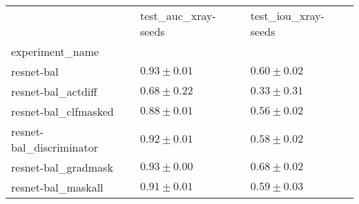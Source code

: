 \begin{tabular}{lll}
\toprule
{} & test_auc_xray-seeds & test_iou_xray-seeds \\
experiment_name          &                     &                     \\
\midrule
resnet-bal               &       $0.93\pm0.01$ &       $0.60\pm0.02$ \\
resnet-bal_actdiff       &       $0.68\pm0.22$ &       $0.33\pm0.31$ \\
resnet-bal_clfmasked     &       $0.88\pm0.01$ &       $0.56\pm0.02$ \\
resnet-bal_discriminator &       $0.92\pm0.01$ &       $0.58\pm0.02$ \\
resnet-bal_gradmask      &       $0.93\pm0.00$ &       $0.68\pm0.02$ \\
resnet-bal_maskall       &       $0.91\pm0.01$ &       $0.59\pm0.03$ \\
\bottomrule
\end{tabular}
